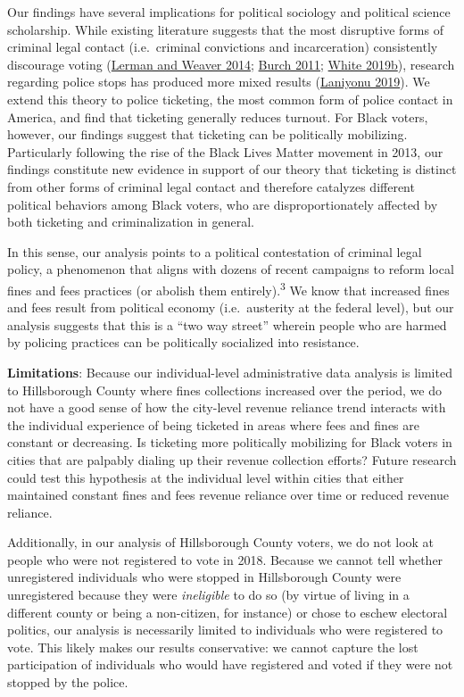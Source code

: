 \documentclass[
  12pt,
]{article}
\begin{document}
Our findings have several implications for political sociology and political science scholarship. While existing literature suggests that the most disruptive forms of criminal legal contact (i.e.~criminal convictions and incarceration) consistently discourage voting (\protect\hyperlink{ref-Lerman2014}{Lerman and Weaver 2014}; \protect\hyperlink{ref-Burch2011}{Burch 2011}; \protect\hyperlink{ref-White2019a}{White 2019b}), research regarding police stops has produced more mixed results (\protect\hyperlink{ref-Laniyonu2019}{Laniyonu 2019}). We extend this theory to police ticketing, the most common form of police contact in America, and find that ticketing generally reduces turnout. For Black voters, however, our findings suggest that ticketing can be politically mobilizing. Particularly following the rise of the Black Lives Matter movement in 2013, our findings constitute new evidence in support of our theory that ticketing is distinct from other forms of criminal legal contact and therefore catalyzes different political behaviors among Black voters, who are disproportionately affected by both ticketing and criminalization in general.

In this sense, our analysis points to a political contestation of criminal legal policy, a phenomenon that aligns with dozens of recent campaigns to reform local fines and fees practices (or abolish them entirely).\textsuperscript{3} We know that increased fines and fees result from political economy (i.e.~austerity at the federal level), but our analysis suggests that this is a ``two way street'' wherein people who are harmed by policing practices can be politically socialized into resistance.

\textbf{Limitations}: Because our individual-level administrative data analysis is limited to Hillsborough County where fines collections increased over the period, we do not have a good sense of how the city-level revenue reliance trend interacts with the individual experience of being ticketed in areas where fees and fines are constant or decreasing. Is ticketing more politically mobilizing for Black voters in cities that are palpably dialing up their revenue collection efforts? Future research could test this hypothesis at the individual level within cities that either maintained constant fines and fees revenue reliance over time or reduced revenue reliance.

Additionally, in our analysis of Hillsborough County voters, we do not look at people who were not registered to vote in 2018. Because we cannot tell whether unregistered individuals who were stopped in Hillsborough County were unregistered because they were \emph{ineligible} to do so (by virtue of living in a different county or being a non-citizen, for instance) or chose to eschew electoral politics, our analysis is necessarily limited to individuals who were registered to vote. This likely makes our results conservative: we cannot capture the lost participation of individuals who would have registered and voted if they were not stopped by the police.
\end{document}
